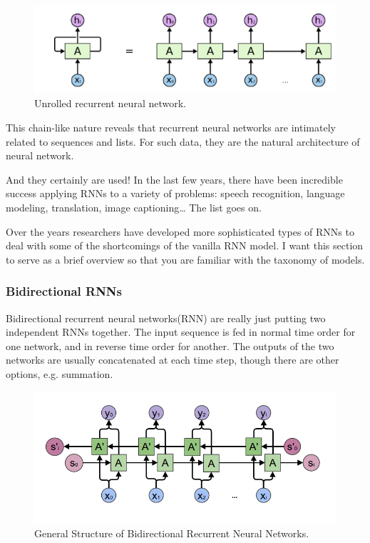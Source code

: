 \begin{figure}[H]
    \centering
    \includegraphics[width=6.5in]{images/rnnUnroll.png}
    \caption{Unrolled recurrent neural network.}
    \label{fig:rnnUnroll}
\end{figure}

This chain-like nature reveals that recurrent neural networks are intimately related to sequences and lists. For such data, they are the natural architecture of neural network.

And they certainly are used! In the last few years, there have been incredible success applying RNNs to a variety of problems: speech recognition, language modeling, translation, image captioning… The list goes on.

Over the years researchers have developed more sophisticated types of RNNs to deal with some of the shortcomings of the vanilla RNN model. I want this section to serve as a brief overview so that you are familiar with the taxonomy of models.

\subsubsection{Bidirectional RNNs}

Bidirectional recurrent neural networks(RNN) are really just putting two independent RNNs together. The input sequence is fed in normal time order for one network, and in reverse time order for another. The outputs of the two networks are usually concatenated at each time step, though there are other options, e.g. summation.

\begin{figure}[H]
    \centering
    \includegraphics[width=6.5in]{images/bidirectionalRNN.png}
    \caption{General Structure of Bidirectional Recurrent Neural Networks.}
    \label{fig:bidirectionalRNN}
\end{figure}

